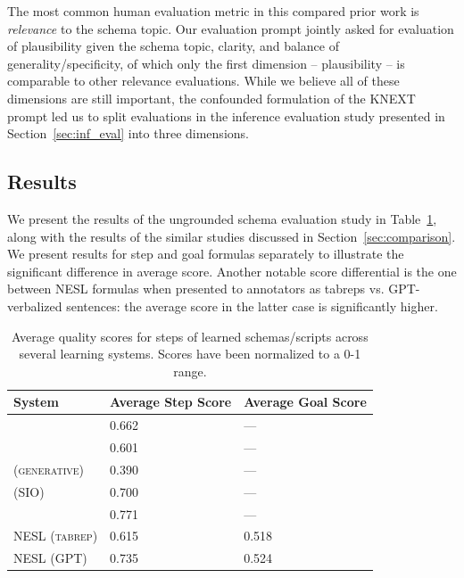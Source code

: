 The most common human evaluation metric in this compared prior work is \textit{relevance} to the schema topic. Our evaluation prompt jointly asked for evaluation of plausibility given the schema topic, clarity, and balance of generality/specificity, of which only the first dimension -- plausibility -- is comparable to other relevance evaluations. While we believe all of these dimensions are still important, the confounded formulation of the KNEXT prompt led us to split evaluations in the inference evaluation study presented in Section~\ref{sec:inf_eval} into three dimensions.

\subsection{Results}
We present the results of the ungrounded schema evaluation study in Table~\ref{tab:schema_results}, along with the results of the similar studies discussed in Section~\ref{sec:comparison}. We present results for step and goal formulas separately to illustrate the significant difference in average score. Another notable score differential is the one between NESL formulas when presented to annotators as tabreps vs. GPT-verbalized sentences: the average score in the latter case is significantly higher.

\begin{table}[ht]
    \centering
    \begin{tabular}{l|l|l}
       \textbf{System} & \textbf{Average Step Score} & \textbf{Average Goal Score} \\
       \hline
       \citet{pichotta2016learning} & 0.662 & --- \\
       \citet{weber_causal_scripts} & 0.601 & --- \\
       \citet{goal-oriented-scripts} \textsc{(generative)} & 0.390 & --- \\
       \citet{goal-oriented-scripts} \textsc{(SIO)} & 0.700 & --- \\
       \citet{starsem-scripts} & 0.771 & --- \\
       \textsc{NESL (tabrep)} & 0.615 & 0.518 \\
       \textsc{NESL (GPT)} & 0.735 & 0.524 \\
    \end{tabular}
    \caption{Average quality scores for steps of learned schemas/scripts across several learning systems. Scores have been normalized to a 0-1 range.}
    \label{tab:schema_results}
\end{table}

